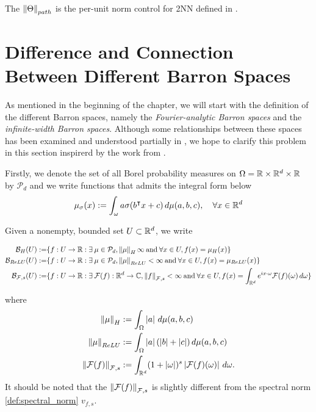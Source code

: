 The $\left\| \Theta \right\|_{path}$ is the per-unit norm control for 2NN defined in
\cite{neyshaburNormBasedCapacityControl2015}. 

\section{Difference and Connection Between Different Barron Spaces}
\label{sec:diff_barron_spaces}


As mentioned in the beginning of the chapter, we will start with the definition
of the different Barron spaces, namely the \textit{Fourier-analytic Barron
spaces} and the \textit{infinite-width Barron spaces}. Although some
relationships between these spaces has been examined and understood partially in
\cite{eBarronSpaceFlowinduced2021,eMathematicalUnderstandingNeural2020}, we hope
to clarify this problem in this section inspirerd by the work from
\cite{carageaNeuralNetworkApproximation2022}.

Firstly, we denote the set of all Borel probability measures on $\Omega = \mathbb{R}
\times \mathbb{R}^d \times \mathbb{R}$ by $\mathcal{P}_d$ and we write functions that admits the
integral form below
\begin{equation}
    \mu_{\sigma}(x) := \int_{\omega} a\sigma(b{}^{\intercal} x + c) \,d\mu(a,b,c), \quad
    \forall x \in \mathbb{R}^d
\end{equation}

Given a nonempty, bounded set $U \subset \mathbb{R}^d$, we write

\begin{align*}
    \mathcal{B}_{H}(U) :=
    & \{f: U \to \mathbb{R}: \exists\: \mu \in \mathcal{P}_d, \left\| \mu \right\|_H \infty 
    \:\text{and}\: \forall x \in U, f(x) = \mu_{H}(x) \} \\
    \mathcal{B}_{ReLU}(U) :=
    & \{f: U \to \mathbb{R}: \exists\: \mu \in \mathcal{P}_d, \left\| \mu \right\|_{ReLU} < \infty
    \:\text{and}\: \forall x \in U, f(x) = \mu_{ReLU}(x) \} \\
    \mathcal{B}_{\mathcal{F},s}(U) :=
    & \{f: U \to \mathbb{R}: \exists\: \mathcal{F}(f): \mathbb{R}^d \to \mathbb{C}, \left\| f \right\|_{\mathcal{F}, s} < \infty 
    \:\text{and}\: \forall x \in U, 
    f(x) = \int_{\mathbb{R}^d} e^{ix \cdot \omega} \mathcal{F}(f)(\omega) \,d\omega \} \\
\end{align*}

where
\begin{align*}
    \left\| \mu \right\|_H      &:= \int_{\Omega} \left| a \right|\,d\mu(a,b,c) \\
    \left\| \mu \right\|_{ReLU} &:= \int_{\Omega} \left| a \right| (\left| b \right| + \left| c \right|)\,d\mu(a,b,c) \\
    \left\| \mathcal{F}(f) \right\|_{\mathcal{F},s} 
                      &:= \int_{\mathbb{R}^d} (1 + \left| \omega \right|)^s \left| \mathcal{F}(f)(\omega) \right|\,d\omega.
\end{align*}
It should be noted that the $\left\| \mathcal{F}(f) \right\|_{\mathcal{F},s}$ is slightly
different from the spectral norm \eqref{def:spectral_norm} $v_{f,s}$.

